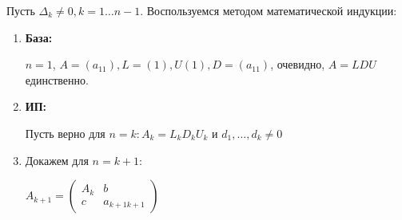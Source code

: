     Пусть $\Delta_k \neq 0, k = 1\ldots n-1$. Воспользуемся методом математической индукции:
    \begin{enumerate}
        \item[] \textbf{База:}
        
        $n=1$, $A = (a_{11}), L= (1), U(1) , D = (a_{11})$, очевидно, $A = LDU$ единственно.
        \item[] \textbf{ИП:}

        Пусть верно для $n =k: A_k  =L_k D_k U_k$ и $d_1,\ldots, d_k \neq 0$

        \item[] Докажем для $n = k+1$:

        $A_{k+1} = \begin{pmatrix}
            A_k & b \\
            c & a_{k+1 k+1}
        \end{pmatrix}$


\end{enumerate}
